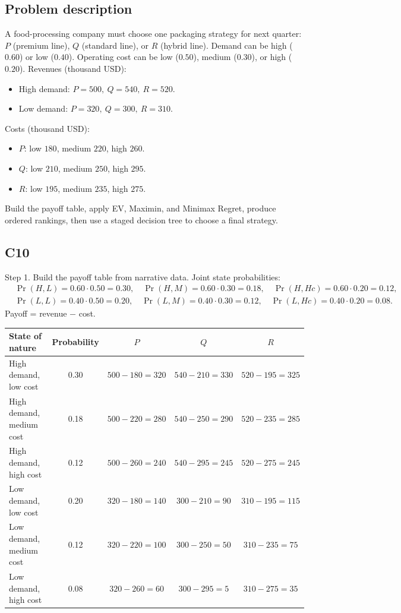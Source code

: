 	\begin{ExamProblems}
		\item
		\subsection*{Problem description}
		A food-processing company must choose one packaging strategy for next quarter:
		$P$ (premium line), $Q$ (standard line), or $R$ (hybrid line).
		Demand can be high ($0.60$) or low ($0.40$).
		Operating cost can be low ($0.50$), medium ($0.30$), or high ($0.20$).
		Revenues (thousand USD):
		\begin{itemize}
			\item High demand: $P=500,\ Q=540,\ R=520$.
			\item Low demand: $P=320,\ Q=300,\ R=310$.
		\end{itemize}
		Costs (thousand USD):
		\begin{itemize}
			\item $P$: low $180$, medium $220$, high $260$.
			\item $Q$: low $210$, medium $250$, high $295$.
			\item $R$: low $195$, medium $235$, high $275$.
		\end{itemize}
		Build the payoff table, apply EV, Maximin, and Minimax Regret, produce ordered rankings, then use a staged decision tree to choose a final strategy.

		\subsection*{C10}
		Step 1. Build the payoff table from narrative data.
		Joint state probabilities:
		\[
		\begin{aligned}
		&\Pr(H,L)=0.60\cdot 0.50=0.30,\quad \Pr(H,M)=0.60\cdot 0.30=0.18,\quad \Pr(H,Hc)=0.60\cdot 0.20=0.12,\\
		&\Pr(L,L)=0.40\cdot 0.50=0.20,\quad \Pr(L,M)=0.40\cdot 0.30=0.12,\quad \Pr(L,Hc)=0.40\cdot 0.20=0.08.
		\end{aligned}
		\]
		Payoff = revenue $-$ cost.
		\begin{center}
			\begin{tabular}{l c c c c}
				\toprule
				State of nature & Probability & $P$ & $Q$ & $R$ \\
				\midrule
				High demand, low cost & 0.30 & $500-180=320$ & $540-210=330$ & $520-195=325$ \\
				High demand, medium cost & 0.18 & $500-220=280$ & $540-250=290$ & $520-235=285$ \\
				High demand, high cost & 0.12 & $500-260=240$ & $540-295=245$ & $520-275=245$ \\
				Low demand, low cost & 0.20 & $320-180=140$ & $300-210=90$ & $310-195=115$ \\
				Low demand, medium cost & 0.12 & $320-220=100$ & $300-250=50$ & $310-235=75$ \\
				Low demand, high cost & 0.08 & $320-260=60$ & $300-295=5$ & $310-275=35$ \\
				\bottomrule
			\end{tabular}
		\end{center}


\end{ExamProblems}
